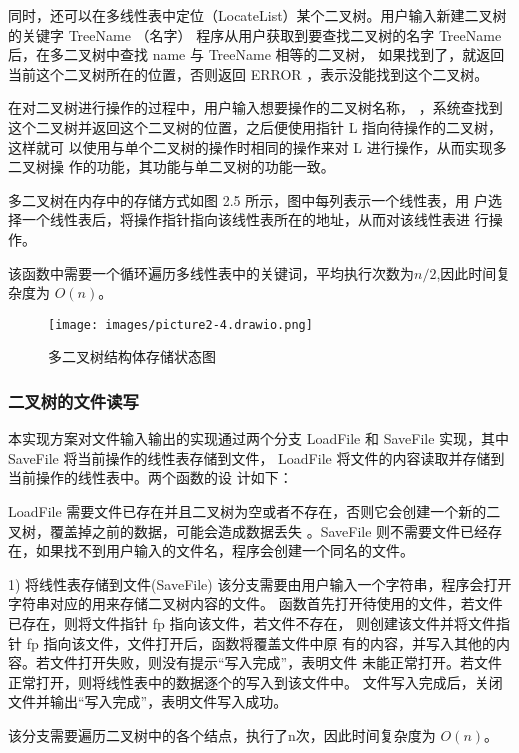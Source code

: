 \documentclass[supercite]{Experimental_Report}
\theoremstyle{definition}
\begin{document}
同时，还可以在多线性表中定位（LocateList）某个二叉树。用户输入新建二叉树的关键字 TreeName （名字）
程序从用户获取到要查找二叉树的名字 TreeName 后，在多二叉树中查找 name 与 TreeName 相等的二叉树，
如果找到了，就返回当前这个二叉树所在的位置，否则返回 ERROR ，表示没能找到这个二叉树。

在对二叉树进行操作的过程中，用户输入想要操作的二叉树名称，
，系统查找到这个二叉树并返回这个二叉树的位置，之后便使用指针 L 指向待操作的二叉树，这样就可
以使用与单个二叉树的操作时相同的操作来对 L 进行操作，从而实现多二叉树操
作的功能，其功能与单二叉树的功能一致。

多二叉树在内存中的存储方式如图 2.5 所示，图中每列表示一个线性表，用
户选择一个线性表后，将操作指针指向该线性表所在的地址，从而对该线性表进
行操作。

该函数中需要一个循环遍历多线性表中的关键词，平均执行次数为$n/2$,因此时间复杂度为 $O(n)$。

\begin{figure}[H]
	\begin{center}
		\texttt{[image: images/picture2-4.drawio.png]}
		\vspace{0.6cm}
		\caption{多二叉树结构体存储状态图}
		\label{fig2-5}
	\end{center}
\end{figure}
\subsubsection{二叉树的文件读写}

本实现方案对文件输入输出的实现通过两个分支 LoadFile 和
SaveFile 实现，其中 SaveFile 将当前操作的线性表存储到文件，
LoadFile 将文件的内容读取并存储到当前操作的线性表中。两个函数的设
计如下：

LoadFile 需要文件已存在并且二叉树为空或者不存在，否则它会创建一个新的二叉树，覆盖掉之前的数据，可能会造成数据丢失
。SaveFile 则不需要文件已经存在，如果找不到用户输入的文件名，程序会创建一个同名的文件。

1) 将线性表存储到文件(SaveFile)
该分支需要由用户输入一个字符串，程序会打开字符串对应的用来存储二叉树内容的文件。
函数首先打开待使用的文件，若文件已存在，则将文件指针 fp 指向该文件，若文件不存在，
则创建该文件并将文件指针 fp 指向该文件，文件打开后，函数将覆盖文件中原
有的内容，并写入其他的内容。若文件打开失败，则没有提示“写入完成”，表明文件
未能正常打开。若文件正常打开，则将线性表中的数据逐个的写入到该文件中。
文件写入完成后，关闭文件并输出“写入完成”，表明文件写入成功。

该分支需要遍历二叉树中的各个结点，执行了n次，因此时间复杂度为 $O(n)$。
\end{document}
